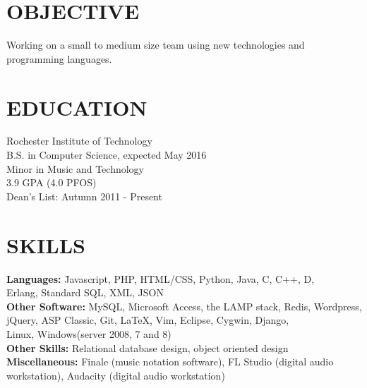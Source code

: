 \documentclass[line,margin]{res}
\begin{document}
\address{6000 Reynolds Dr, \#1482\\ Rochester, NY 14623}
\address{(646) 320-9143\\leeavital@gmail.com}


\begin{resume}
 
\section{OBJECTIVE}  Working on a small to medium size team using 
                     new technologies and programming languages.      
\section{EDUCATION}  Rochester Institute of Technology \\ 
                     B.S. in  Computer Science,  expected May 2016 \\
	                 Minor in Music and Technology\\
	                 3.9 GPA (4.0 PFOS) \\
	                 Dean's List: Autumn 2011 - Present
 
\section{SKILLS} 
 \vspace{-2ex}
	\begin{tabbing}
    {\bf Languages:} \hspace{.5in} 	\= Javascript,  PHP, HTML/CSS, Python, Java, C, C++, D, \\
				                    \> Erlang, Standard SQL, XML, JSON \\
	{\bf Other Software:}           \> MySQL, Microsoft Access, the LAMP stack, Redis, Wordpress,  \\ 
				                    \>	jQuery, ASP Classic, Git, LaTeX, Vim, Eclipse, Cygwin, Django, \\
				                    \>  Linux, Windows(server 2008, 7 and 8) \\
	
	{\bf Other Skills:} \> Relational database design, object oriented design \\
	
	{\bf Miscellaneous: } \> Finale (music notation software), FL Studio (digital audio \\ 
				 \>workstation),  Audacity (digital audio workstation)
	\end{tabbing}
	

\end{resume}
\end{document}
